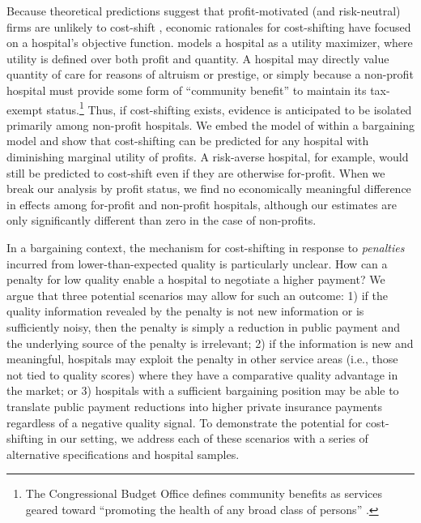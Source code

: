 \documentclass[12pt]{article}
\begin{document}
Because theoretical predictions suggest that profit-motivated (and risk-neutral) firms are unlikely to cost-shift \citep{hay1983}, economic rationales for cost-shifting have focused on a hospital's objective function.  \cite{dranove1988} models a hospital as a utility maximizer, where utility is defined over both profit and quantity.  A hospital may directly value quantity of care for reasons of altruism or prestige, or simply because a non-profit hospital must provide some form of ``community benefit'' to maintain its tax-exempt status.\footnote{The Congressional Budget Office defines community benefits as services geared toward ``promoting the health of any broad class of persons'' \citep{cbo2006}.}  Thus, if cost-shifting exists, evidence is anticipated to be isolated primarily among non-profit hospitals. We embed the model of \cite{dranove1988} within a bargaining model \citep{ho2017} and show that cost-shifting can be predicted for any hospital with diminishing marginal utility of profits. A risk-averse hospital, for example, would still be predicted to cost-shift even if they are otherwise for-profit. When we break our analysis by profit status, we find no economically meaningful difference in effects among for-profit and non-profit hospitals, although our estimates are only significantly different than zero in the case of non-profits.

In a bargaining context, the mechanism for cost-shifting in response to \textit{penalties} incurred from lower-than-expected quality is particularly unclear. How can a penalty for low quality enable a hospital to negotiate a higher payment? We argue that three potential scenarios may allow for such an outcome: 1) if the quality information revealed by the penalty is not new information or is sufficiently noisy, then the penalty is simply a reduction in public payment and the underlying source of the penalty is irrelevant; 2) if the information is new and meaningful, hospitals may exploit the penalty in other service areas (i.e., those not tied to quality scores) where they have a comparative quality advantage in the market; or 3) hospitals with a sufficient bargaining position may be able to translate public payment reductions into higher private insurance payments regardless of a negative quality signal. To demonstrate the potential for cost-shifting in our setting, we address each of these scenarios with a series of alternative specifications and hospital samples.
\end{document}
